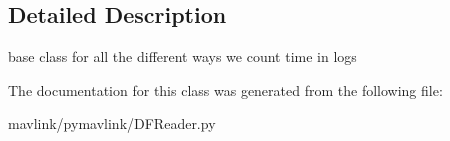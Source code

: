 \subsection{Detailed Description}
\begin{DoxyVerb}base class for all the different ways we count time in logs\end{DoxyVerb}
 

The documentation for this class was generated from the following file\+:\begin{DoxyCompactItemize}
\item 
mavlink/pymavlink/D\+F\+Reader.\+py\end{DoxyCompactItemize}
